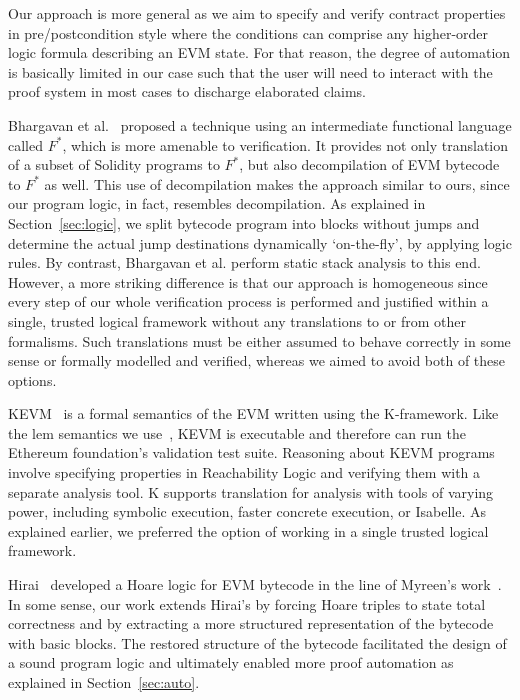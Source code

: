 \documentclass[sigplan,10pt,review]{acmart}\settopmatter{printfolios=true,printccs=false,printacmref=false}
\begin{document}
Our approach is more general as we aim to specify and verify contract properties in pre/postcondition
style where the conditions can comprise any higher-order logic formula describing an EVM state. 
For that reason, the degree of automation is basically limited in our case such that the user will need to interact 
with the proof system in most cases to discharge elaborated claims. 

Bhargavan et al.~\cite{Bhargavan:2016:FVS:2993600.2993611} proposed a technique using an
intermediate functional language called $F^*$,
which is more amenable to verification. 
It provides not only translation of a subset of Solidity programs 
to $F^*$, but also decompilation of EVM bytecode to $F^*$ as well.
This use of decompilation makes
the approach similar to ours, since our program logic, in fact, resembles decompilation.
As explained in Section~\ref{sec:logic}, we split bytecode program into blocks without jumps
and determine the actual jump destinations dynamically `on-the-fly', by applying logic rules.
By contrast, Bhargavan et al. perform static stack analysis to this end.
However, a more striking difference is that our approach is homogeneous since every step of our whole verification process 
is performed and justified within a single, trusted logical framework without any translations to or from other formalisms.
Such translations must be either assumed to behave correctly in some sense or
formally modelled and verified, whereas we aimed to avoid both of these options.

KEVM~\cite{Hildenbrandt_SZRDGR_17} is a formal semantics of the EVM written using the K-framework.
Like the lem semantics we use~\cite{Yoichi}, KEVM is executable and therefore can run the Ethereum foundation's validation test suite.
Reasoning about KEVM programs involve specifying properties in Reachability Logic and
verifying them with a separate analysis tool.
K supports translation for analysis with tools of varying
power, including symbolic execution, faster concrete execution, or Isabelle.
As explained earlier, we preferred the option of working in a single trusted logical framework.

Hirai~\cite{Yoichi} developed a Hoare logic for EVM bytecode
in the line of Myreen's work~\cite{DBLP:phd/ethos/Myreen09}.
In some sense, our work extends Hirai's by forcing Hoare triples to
state total correctness and by extracting a more structured representation
of the bytecode with basic blocks.
The restored structure of the bytecode facilitated the design of
a sound program logic and ultimately enabled more proof
automation as explained in Section~\ref{sec:auto}.
\end{document}
